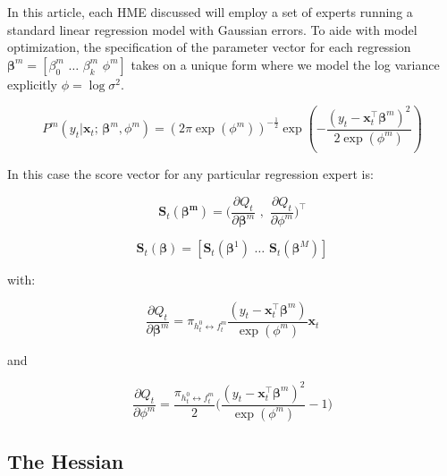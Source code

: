 \documentclass[12pt]{article}
\newcommand{\gateprod}[2]{\pi_{#1 \longleftrightarrow #2}}
\begin{document}
In this article, each HME discussed will employ a set of experts running 
a standard linear regression model with Gaussian errors. To aide with model optimization,
the specification of the parameter vector for each regression
 $\boldsymbol{\beta}^{m} = [\beta_{0}^{m} \,\, \ldots \,\, \beta_{k}^m \,\, \phi^{m}]$
takes on a unique form where we model the log variance explicitly
$\phi = \log \sigma^{2}$.

\begin{equation}
  P^{m}(y_{t} | \boldsymbol{x}_{t}; \, \boldsymbol{\beta}^{m}, \phi^{m}) = \left( 2 \pi \exp ( \phi^{m} ) \right)^{-\frac{1}{2}} \exp{ \left( -\frac{  ( y_{t} - \boldsymbol{x}^{\top}_{t} \boldsymbol{\beta}^{m} )^{2}  }{2 \exp (\phi^{m}) } \right) }
\end{equation}


In this case the score vector for any particular
regression expert is:

\begin{equation} \label{eq:expertScore}
  \boldsymbol{S}_{t}(\boldsymbol{\beta^{m}}) = \Big( \frac{\partial Q_{t}}{\partial \boldsymbol{\beta}^{m}} \,\,,\,\, \frac{\partial Q_{t}}{\partial \phi^{m}} \Big)^{\top}
\end{equation}

\begin{equation}
  \boldsymbol{S}_{t}(\boldsymbol{\beta}) = [ \boldsymbol{S}_{t}(\boldsymbol{\beta}^{1}) \,\, \ldots \,\, \boldsymbol{S}_{t}(\boldsymbol{\beta}^{M}) ]
\end{equation}



with:

\begin{equation}
  \frac{\partial Q_{t}}{\partial \boldsymbol{\beta}^{m}} = \gateprod{h^{0}_{t}}{f^{m}_{t}} \frac{( y_{t} - \boldsymbol{x}^{\top}_{t} \boldsymbol{\beta}^{m} )}{\exp{(\phi^{m})}} \boldsymbol{x}_{t}
\end{equation}
 
and

\begin{equation}
  \frac{\partial Q_{t}}{\partial \phi^{m}} = \frac{\gateprod{h^{0}_{t}}{f^{m}_{t}}}{2} \Big( \frac{( y_{t} - \boldsymbol{x}^{\top}_{t} \boldsymbol{\beta}^{m} )^{2}}{\exp{(\phi^{m})}} - 1 \Big)
\end{equation}




\subsection{The Hessian}
\end{document}
